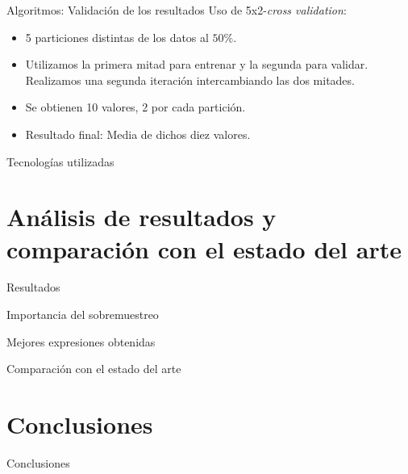 \documentclass{beamer}
\begin{document}
\begin{frame}{Algoritmos: Validación de los resultados}
	Uso de 5x2-\textit{cross validation}:

	\begin{itemize}
		\item 5 particiones distintas de los datos al $50\%$.
		\item Utilizamos la primera mitad para entrenar y la segunda para validar. Realizamos una segunda iteración intercambiando las dos mitades.
		\item Se obtienen 10 valores, 2 por cada partición.
		\item Resultado final: Media de dichos diez valores.
	\end{itemize}

\end{frame}

\begin{frame}{Tecnologías utilizadas}


\end{frame}

\section{Análisis de resultados y comparación con el estado del arte}
\begin{frame}{Resultados}


\end{frame}

\begin{frame}{Importancia del sobremuestreo}


\end{frame}

\begin{frame}{Mejores expresiones obtenidas}


\end{frame}

\begin{frame}{Comparación con el estado del arte}


\end{frame}



\section{Conclusiones}
\begin{frame}{Conclusiones}


\end{frame}
\end{document}
